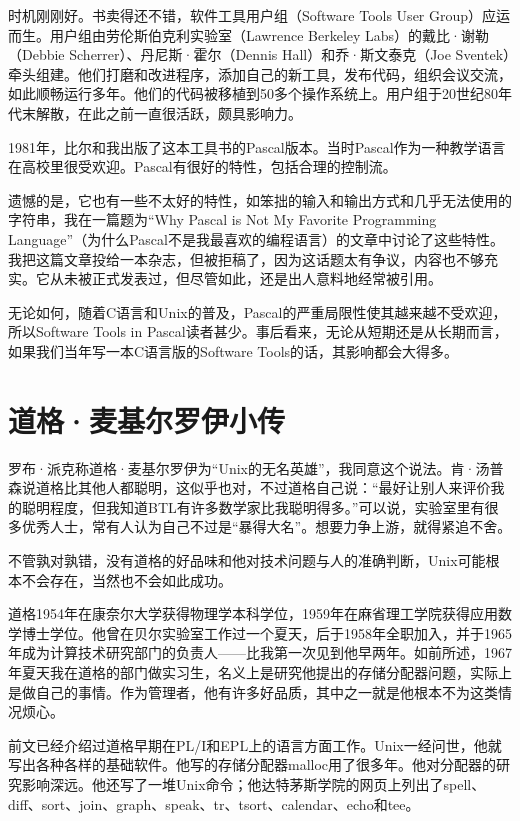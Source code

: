 \documentclass[a4paper,12pt,UTF8,twoside]{ctexbook}
\begin{document}
时机刚刚好。书卖得还不错，软件工具用户组（Software Tools User Group）应运而生。用户组由劳伦斯伯克利实验室（Lawrence Berkeley Labs）的戴比·谢勒（Debbie Scherrer）、丹尼斯·霍尔（Dennis Hall）和乔·斯文泰克（Joe Sventek）牵头组建。他们打磨和改进程序，添加自己的新工具，发布代码，组织会议交流，如此顺畅运行多年。他们的代码被移植到50多个操作系统上。用户组于20世纪80年代末解散，在此之前一直很活跃，颇具影响力。

1981年，比尔和我出版了这本工具书的Pascal版本。当时Pascal作为一种教学语言在高校里很受欢迎。Pascal有很好的特性，包括合理的控制流。

遗憾的是，它也有一些不太好的特性，如笨拙的输入和输出方式和几乎无法使用的字符串，我在一篇题为“Why Pascal is Not My Favorite Programming Language”（为什么Pascal不是我最喜欢的编程语言）的文章中讨论了这些特性。我把这篇文章投给一本杂志，但被拒稿了，因为这话题太有争议，内容也不够充实。它从未被正式发表过，但尽管如此，还是出人意料地经常被引用。

无论如何，随着C语言和Unix的普及，Pascal的严重局限性使其越来越不受欢迎，所以Software Tools in Pascal读者甚少。事后看来，无论从短期还是从长期而言，如果我们当年写一本C语言版的Software Tools的话，其影响都会大得多。

\section{道格·麦基尔罗伊小传}

罗布·派克称道格·麦基尔罗伊为“Unix的无名英雄”，我同意这个说法。肯·汤普森说道格比其他人都聪明，这似乎也对，不过道格自己说：“最好让别人来评价我的聪明程度，但我知道BTL有许多数学家比我聪明得多。”可以说，实验室里有很多优秀人士，常有人认为自己不过是“暴得大名”。想要力争上游，就得紧追不舍。

不管孰对孰错，没有道格的好品味和他对技术问题与人的准确判断，Unix可能根本不会存在，当然也不会如此成功。

道格1954年在康奈尔大学获得物理学本科学位，1959年在麻省理工学院获得应用数学博士学位。他曾在贝尔实验室工作过一个夏天，后于1958年全职加入，并于1965年成为计算技术研究部门的负责人——比我第一次见到他早两年。如前所述，1967年夏天我在道格的部门做实习生，名义上是研究他提出的存储分配器问题，实际上是做自己的事情。作为管理者，他有许多好品质，其中之一就是他根本不为这类情况烦心。

前文已经介绍过道格早期在PL/I和EPL上的语言方面工作。Unix一经问世，他就写出各种各样的基础软件。他写的存储分配器malloc用了很多年。他对分配器的研究影响深远。他还写了一堆Unix命令；他达特茅斯学院的网页上列出了spell、diff、sort、join、graph、speak、tr、tsort、calendar、echo和tee。
\end{document}
